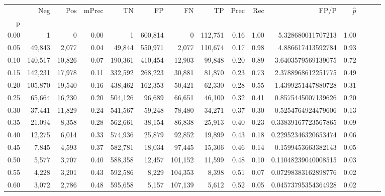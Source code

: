 \begin{tabular}{rrrrrrrrrrrrrrr}
\toprule
{} &      Neg &     Pos & mPrec &       TN &       FP &       FN &       TP &  Prec &   Rec &                   FP/P & $\hat{p}$ \\
p    &          &         &       &          &          &          &          &       &       &                        &           \\
\midrule
0.00 &        1 &       0 &  0.00 &        1 &  600,814 &        0 &  112,751 &  0.16 &  1.00 &      5.328680011707213 &      1.00 \\
0.05 &   49,843 &   2,077 &  0.04 &   49,844 &  550,971 &    2,077 &  110,674 &  0.17 &  0.98 &      4.886617413592784 &      0.93 \\
0.10 &  140,517 &  10,826 &  0.07 &  190,361 &  410,454 &   12,903 &   99,848 &  0.20 &  0.89 &     3.6403579569139075 &      0.72 \\
0.15 &  142,231 &  17,978 &  0.11 &  332,592 &  268,223 &   30,881 &   81,870 &  0.23 &  0.73 &     2.3788968612251775 &      0.49 \\
0.20 &  105,870 &  19,540 &  0.16 &  438,462 &  162,353 &   50,421 &   62,330 &  0.28 &  0.55 &     1.4399251447880728 &      0.31 \\
0.25 &   65,664 &  16,230 &  0.20 &  504,126 &   96,689 &   66,651 &   46,100 &  0.32 &  0.41 &     0.8575445007139626 &      0.20 \\
0.30 &   37,441 &  11,829 &  0.24 &  541,567 &   59,248 &   78,480 &   34,271 &  0.37 &  0.30 &     0.5254764924479606 &      0.13 \\
0.35 &   21,094 &   8,358 &  0.28 &  562,661 &   38,154 &   86,838 &   25,913 &  0.40 &  0.23 &    0.33839167723567865 &      0.09 \\
0.40 &   12,275 &   6,014 &  0.33 &  574,936 &   25,879 &   92,852 &   19,899 &  0.43 &  0.18 &    0.22952346320653474 &      0.06 \\
0.45 &    7,845 &   4,593 &  0.37 &  582,781 &   18,034 &   97,445 &   15,306 &  0.46 &  0.14 &     0.1599453663382143 &      0.05 \\
0.50 &    5,577 &   3,707 &  0.40 &  588,358 &   12,457 &  101,152 &   11,599 &  0.48 &  0.10 &    0.11048239040008515 &      0.03 \\
0.55 &    4,228 &   3,201 &  0.43 &  592,586 &    8,229 &  104,353 &    8,398 &  0.51 &  0.07 &    0.07298383162898776 &      0.02 \\
0.60 &    3,072 &   2,786 &  0.48 &  595,658 &    5,157 &  107,139 &    5,612 &  0.52 &  0.05 &    0.04573795354364928 &      0.02 \\

\end{tabular}

